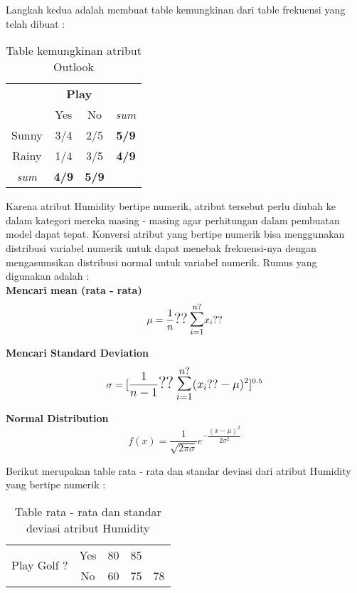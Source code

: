 		
		Langkah kedua adalah membuat table kemungkinan dari table frekuensi yang telah dibuat :		
		\begin{table}[ht]
			\centering
			\caption{Table kemungkinan atribut Outlook}
			\begin{tabular}{|c|c|c|c|}
			\toprule
			 & \multicolumn{2}{c}{\textbf{Play}} & \\
			 & Yes & No & \textit{sum} \\ 
			\midrule
			Sunny & 3/4 & 2/5 & \textbf{5/9}\\
			\midrule
			Rainy & 1/4 & 3/5 & \textbf{4/9} \\
			\midrule
			\textit{sum} & \textbf{4/9} & \textbf{5/9} & \\
			\bottomrule
			\end{tabular}
		\end{table}
		
		Karena atribut Humidity bertipe numerik, atribut tersebut perlu diubah ke dalam kategori mereka masing - masing agar perhitungan dalam pembuatan model dapat tepat. Konversi atribut yang bertipe numerik bisa menggunakan distribusi variabel numerik untuk dapat menebak frekuensi-nya dengan mengasumsikan distribusi normal untuk variabel numerik. Rumus yang digunakan adalah :\\
		
		\textbf{Mencari mean (rata - rata)} 
		\begin{equation}
			\mu = \dfrac{1}{n} \mathlarger{\mathlarger{??\sum}}_{i=1}^{n?}x_i??
		\end{equation}
		
		\textbf{Mencari Standard Deviation}
		\begin{equation}
			\sigma = \mathlarger{[ \dfrac{1}{n - 1} \mathlarger{\mathlarger{??\sum}}_{i=1}^{n?} (x_i?? - \mu)^2]}^{0.5}
		\end{equation}
		
		\textbf{Normal Distribution}
		\begin{equation}
			f(x) = \dfrac{1}{\sqrt{2\pi\sigma}}e^{-\dfrac{(x-\mu)^2}{2\sigma^2}}
		\end{equation}
		
		Berikut merupakan table rata - rata dan standar deviasi dari atribut Humidity yang bertipe numerik : 
		
		\begin{table}[h]
		\centering
		\caption{Table rata - rata dan standar deviasi atribut Humidity}
		\begin{tabular}{|c|c|c|c|c|}
		\toprule
		\multirow{2}{*}{Play Golf ?} & Yes & 80 & 85 & \\
		 & No & 60 & 75 & 78 \\
		\bottomrule
		\end{tabular}
		\end{table}
		
